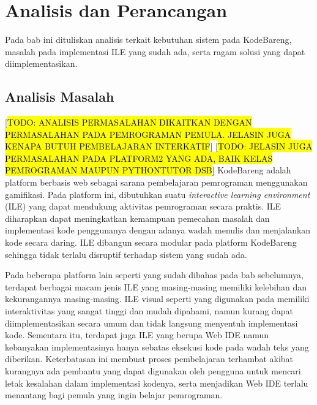 \chapter{Analisis dan Perancangan}
Pada bab ini dituliskan analisis terkait kebutuhan sistem pada KodeBareng, masalah pada implementasi ILE yang sudah ada, serta ragam solusi yang dapat diimplementasikan.

\section{Analisis Masalah}
 [\hl{TODO: ANALISIS PERMASALAHAN DIKAITKAN DENGAN PERMASALAHAN PADA PEMROGRAMAN PEMULA. JELASIN JUGA KENAPA BUTUH PEMBELAJARAN INTERKATIF}]
 [\hl{TODO: JELASIN JUGA PERMASALAHAN PADA PLATFORM2 YANG ADA, BAIK KELAS PEMROGRAMAN MAUPUN PYTHONTUTOR DSB}]
KodeBareng adalah platform berbasis web sebagai sarana pembelajaran pemrograman menggunakan gamifikasi. Pada platform ini, dibutuhkan suatu \textit{interactive learning environment} (ILE) yang dapat mendukung aktivitas pemrograman secara praktis. ILE diharapkan dapat meningkatkan kemampuan pemecahan masalah dan implementasi kode penggunanya dengan adanya wadah menulis dan menjalankan kode secara daring. ILE dibangun secara modular pada platform KodeBareng sehingga tidak terlalu disruptif terhadap sistem yang sudah ada.


Pada beberapa platform lain seperti yang sudah dibahas pada bab sebelumnya, terdapat berbagai macam jenis ILE yang masing-masing memiliki kelebihan dan kekurangannya masing-masing. ILE visual seperti yang digunakan pada \textcite{brilliant2021media} memiliki interaktivitas yang sangat tinggi dan mudah dipahami, namun kurang dapat diimplementasikan secara umum dan tidak langsung menyentuh implementasi kode. Sementara itu, terdapat juga ILE yang berupa Web IDE namun kebanyakan implementasinya hanya sebatas eksekusi kode pada wadah teks yang diberikan. Keterbatasan ini membuat proses pembelajaran terhambat akibat kurangnya ada pembantu yang dapat digunakan oleh pengguna untuk mencari letak kesalahan dalam implementasi kodenya, serta menjadikan Web IDE terlalu menantang bagi pemula yang ingin belajar pemrograman.

